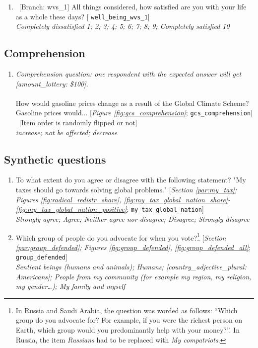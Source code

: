 \documentclass[12pt,english]{article}
\begin{document}
\begin{bibunit}
\begin{enumerate}[resume]
\item ~[Branch: wvs\_1] \label{q:well_being_wvs_1} All things considered, how satisfied are you with your life as a whole these days? [%
\verb|well_being_wvs_1|]
  \\ \textit{Completely dissatisfied 1; 2; 3; 4; 5; 6; 7; 8; 9; Completely satisfied 10}

\end{enumerate} 

 \subsection*{Comprehension} 
 \begin{enumerate}[resume] 
\item  \label{q:gcs_comprehension} \textit{Comprehension question: one respondent with the expected answer will get [amount\_lottery: \$100].}\\\\How would gasoline prices change as a result of the Global Climate Scheme? \\Gasoline prices would... [\textit{Figure \ref{fig:gcs_comprehension}}; 
\verb|gcs_comprehension|]
~[Item order is randomly flipped or not]
  \\ \textit{increase; not be affected; decrease}

\end{enumerate} 

 \subsection*{Synthetic questions} 
 \begin{enumerate}[resume] 
\item  \label{q:my_tax_global_nation} To what extent do you agree or disagree with the following statement? "My taxes should go towards solving global problems." [\textit{Section \ref{par:my_tax}; Figures \ref{fig:radical_redistr_share}, \ref{fig:my_tax_global_nation_share}-\ref{fig:my_tax_global_nation_positive}}; 
\verb|my_tax_global_nation|]
  \\ \textit{Strongly agree; Agree; Neither agree nor disagree; Disagree; Strongly disagree}

\item  \label{q:group_defended} Which group of people do you advocate for when you vote?\footnote{In Russia and Saudi Arabia, the question was worded as follows: ``Which group do you advocate for? For example, if you were the richest person on Earth, which group would you predominantly help with your money?''. In Russia, the item \textit{Russians} had to be replaced with \textit{My compatriots}.} [\textit{Section \ref{par:group_defended}; Figures \ref{fig:group_defended}, \ref{fig:group_defended_all}}; 
\verb|group_defended|] 
  \\ \textit{Sentient beings (humans and animals); Humans; [country\_adjective\_plural: Americans]; People from my community (for example my region, my religion, my gender…); My family and myself}


\end{enumerate}
\end{bibunit}
\end{document}
